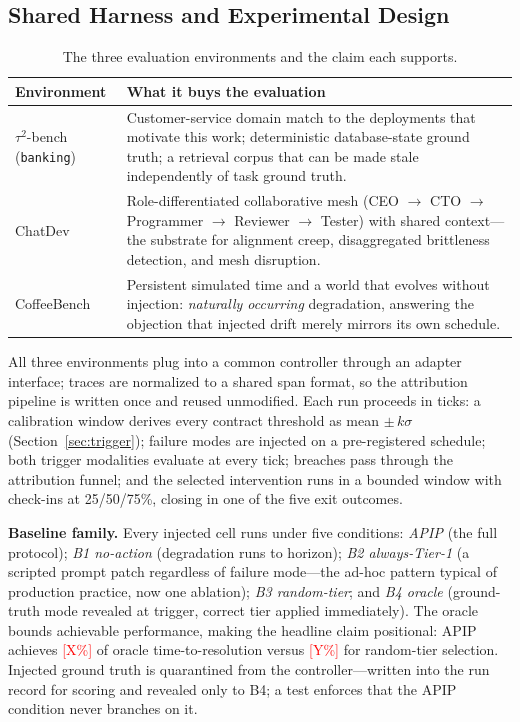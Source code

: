 \documentclass[conference]{IEEEtran}
\newcommand{\ph}[1]{\textcolor{red}{[#1]}}
\newcommand{\code}[1]{\texttt{\small #1}}
\begin{document}
\subsection{Shared Harness and Experimental Design}

\begin{table}[t]
\caption{The three evaluation environments and the claim each supports.}
\label{tab:environments}
\centering
\scriptsize
\begin{tabular}{@{}p{1.7cm}p{5.4cm}@{}}
\toprule
\textbf{Environment} & \textbf{What it buys the evaluation} \\
\midrule
$\tau^2$-bench (\code{banking}) \cite{barres2025} &
Customer-service domain match to the deployments that motivate this work;
deterministic database-state ground truth; a retrieval corpus that can be made
stale independently of task ground truth. \\
\addlinespace
ChatDev \cite{qian2024} &
Role-differentiated collaborative mesh (CEO $\rightarrow$ CTO $\rightarrow$
Programmer $\rightarrow$ Reviewer $\rightarrow$ Tester) with shared
context---the substrate for alignment creep, disaggregated brittleness
detection, and mesh disruption. \\
\addlinespace
CoffeeBench \cite{coffeebench2026} &
Persistent simulated time and a world that evolves without injection:
\emph{naturally occurring} degradation, answering the objection that injected
drift merely mirrors its own schedule. \\
\bottomrule
\end{tabular}
\end{table}

All three environments plug into a common controller through an adapter
interface; traces are normalized to a shared span format, so the attribution
pipeline is written once and reused unmodified. Each run proceeds in ticks: a
calibration window derives every contract threshold as mean $\pm\,k\sigma$
(Section~\ref{sec:trigger}); failure modes are injected on a pre-registered
schedule; both trigger modalities evaluate at every tick; breaches pass through
the attribution funnel; and the selected intervention runs in a bounded window
with check-ins at 25/50/75\%, closing in one of the five exit outcomes.

\textbf{Baseline family.} Every injected cell runs under five conditions:
\emph{APIP} (the full protocol); \emph{B1 no-action} (degradation runs to
horizon); \emph{B2 always-Tier-1} (a scripted prompt patch regardless of failure
mode---the ad-hoc pattern typical of production practice, now one ablation);
\emph{B3 random-tier}; and \emph{B4 oracle} (ground-truth mode revealed at
trigger, correct tier applied immediately). The oracle bounds achievable
performance, making the headline claim positional: APIP achieves \ph{X\%} of
oracle time-to-resolution versus \ph{Y\%} for random-tier selection. Injected
ground truth is quarantined from the controller---written into the run record
for scoring and revealed only to B4; a test enforces that the APIP condition
never branches on it.
\end{document}
